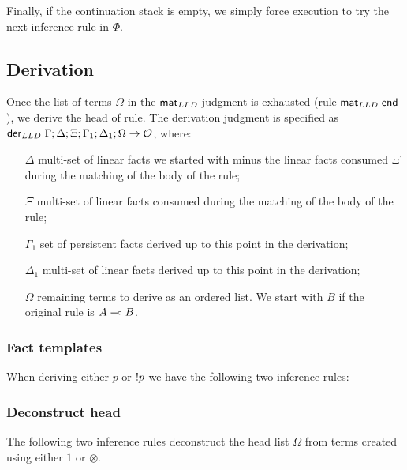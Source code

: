 Finally, if the continuation stack is empty, we simply force execution to try
the next inference rule in $\Phi$.



\subsection{Derivation}

Once the list of terms $\Omega$ in the $\mathsf{mat}_{LLD} \;$judgment is exhausted (rule $\mathsf{mat}_{LLD} \;
\mathsf{end}$), we derive the head of rule.  The derivation judgment is
specified as $\mathsf{der}_{LLD} \; \Gamma; \Delta; \Xi; \Gamma_1; \Delta_1; \Omega \rightarrow
\mathcal{O}$, where:

\begin{enumerate}

   \item[$\Delta$] multi-set of linear facts we started with minus the linear
   facts consumed $\Xi$ during the matching of the body of the rule;

   \item[$\Xi$] multi-set of linear facts consumed during the matching of the
   body of the rule;

   \item[$\Gamma_1$] set of persistent facts derived up to this point in the
   derivation;

   \item[$\Delta_1$] multi-set of linear facts derived up to this point in the
   derivation;

   \item[$\Omega$] remaining terms to derive as an ordered list. We start with
   $B$ if the original rule is $A \multimap B$.

\end{enumerate}

\subsubsection{Fact templates}

When deriving either $p$ or ${!} p$ we have the following two inference rules:



\subsubsection{Deconstruct head}

The following two inference rules deconstruct the head list $\Omega$ from terms
created using either $1$ or $\otimes$.

